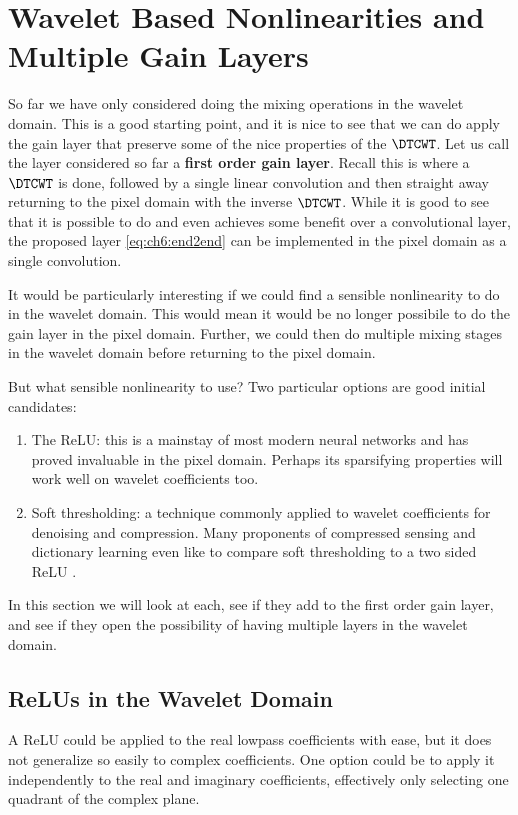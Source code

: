 \section{Wavelet Based Nonlinearities and Multiple Gain Layers}
So far we have only considered doing the mixing operations in the wavelet
domain. This is a good starting point, and it is nice to see that we can do
apply the gain layer that
preserve some of the nice properties of the $\DTCWT$. Let us call the layer
considered so far a \textbf{first order gain layer}. Recall this is where a
$\DTCWT$ is done, followed by a single linear convolution and then straight away
returning to the pixel domain with the inverse $\DTCWT$. While it is good to see
that it is possible to do and even achieves some benefit over a convolutional
layer, the proposed layer \eqref{eq:ch6:end2end} can be implemented in the pixel domain
as a single convolution.

It would be particularly interesting if we could find a sensible nonlinearity to
do in the wavelet domain. This would mean it would be no longer possibile to do the
gain layer in the pixel domain. Further, we could then do multiple mixing
stages in the wavelet domain before returning to the pixel domain.

But what sensible nonlinearity to use? Two particular options are good initial
candidates:
\begin{enumerate}
  \item The ReLU: this is a mainstay of most modern neural networks and has
    proved invaluable in the pixel domain. Perhaps its sparsifying properties
    will work well on wavelet coefficients too. 
  \item Soft thresholding: a technique commonly applied to wavelet
    coefficients for denoising and compression. Many proponents of compressed
    sensing and dictionary learning even like to compare soft thresholding to a
    two sided ReLU \cite{papyan_theoretical_2018, papyan_convolutional_2016}.
\end{enumerate}

In this section we will look at each, see if they add to the first order gain
layer, and see if they open the possibility of having multiple layers in the
wavelet domain. 

\subsection{ReLUs in the Wavelet Domain}
A ReLU could be applied to the real lowpass coefficients with ease, but it does
not generalize so easily to complex coefficients. One option could be to apply
it independently to the real and imaginary coefficients, effectively only
selecting one quadrant of the complex plane.

